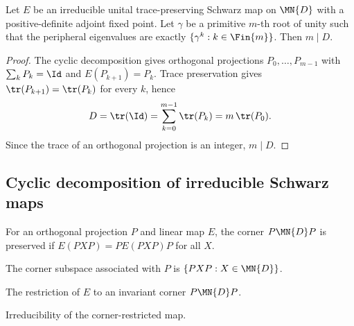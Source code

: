\begin{theorem}%
    \label{thm:channel_period_divides_dim}
    \leanok
    Let $E$ be an irreducible unital trace-preserving Schwarz map on
    $\MN{D}$ with a positive-definite adjoint fixed point. Let $\gamma$
    be a primitive $m$-th root of unity such that the peripheral eigenvalues
    are exactly $\{\gamma^k : k \in \Fin{m}\}$.
    Then $m \mid D$.
\end{theorem}

\begin{proof}
    \leanok
    The cyclic decomposition gives orthogonal projections
    $P_0,\ldots,P_{m-1}$ with $\sum_k P_k=\Id$ and
    $E(P_{k+1})=P_k$. Trace preservation gives
    $\tr(P_{k+1})=\tr(P_k)$ for every $k$, hence
    \[
        D=\tr(\Id)=\sum_{k=0}^{m-1}\tr(P_k)=m\,\tr(P_0).
    \]
    Since the trace of an orthogonal projection is an integer, $m\mid D$.
\end{proof}

\subsection{Cyclic decomposition of irreducible Schwarz maps}

\begin{definition}
    \leanok
    For an orthogonal projection $P$ and linear map $E$, the corner
    $P\MN{D}P$ is preserved if $E(PXP)=PE(PXP)P$ for all $X$.
\end{definition}

\begin{definition}
    \leanok
    The corner subspace associated with $P$ is
    $\{PXP : X\in \MN{D}\}$.
\end{definition}

\begin{definition}
    \leanok
    The restriction of $E$ to an invariant corner $P\MN{D}P$.
\end{definition}

\begin{definition}
    \leanok
    Irreducibility of the corner-restricted map.
\end{definition}

